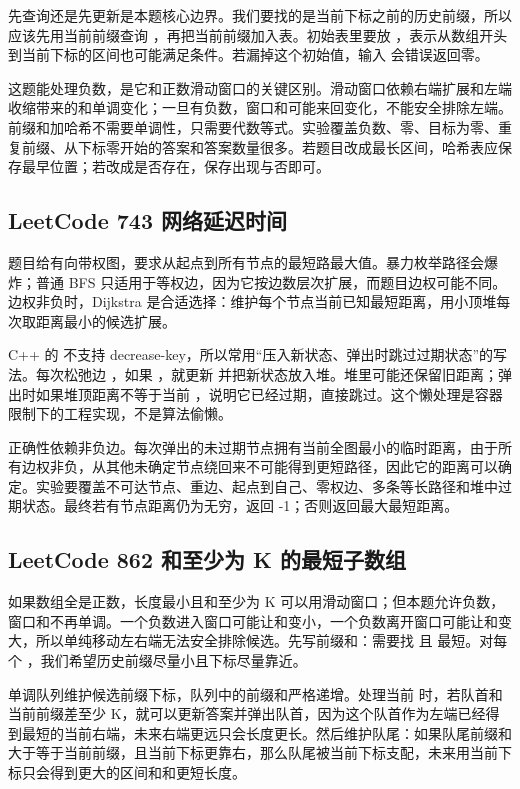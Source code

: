 先查询还是先更新是本题核心边界。我们要找的是当前下标之前的历史前缀，所以应该先用当前前缀查询 ，再把当前前缀加入表。初始表里要放 ，表示从数组开头到当前下标的区间也可能满足条件。若漏掉这个初始值，输入 \code{[k]} 会错误返回零。

这题能处理负数，是它和正数滑动窗口的关键区别。滑动窗口依赖右端扩展和左端收缩带来的和单调变化；一旦有负数，窗口和可能来回变化，不能安全排除左端。前缀和加哈希不需要单调性，只需要代数等式。实验覆盖负数、零、目标为零、重复前缀、从下标零开始的答案和答案数量很多。若题目改成最长区间，哈希表应保存最早位置；若改成是否存在，保存出现与否即可。

\subsection{LeetCode 743 网络延迟时间}

题目给有向带权图，要求从起点到所有节点的最短路最大值。暴力枚举路径会爆炸；普通 BFS 只适用于等权边，因为它按边数层次扩展，而题目边权可能不同。边权非负时，Dijkstra 是合适选择：维护每个节点当前已知最短距离，用小顶堆每次取距离最小的候选扩展。

C++ 的  不支持 decrease-key，所以常用“压入新状态、弹出时跳过过期状态”的写法。每次松弛边 ，如果 ，就更新  并把新状态放入堆。堆里可能还保留旧距离；弹出时如果堆顶距离不等于当前 ，说明它已经过期，直接跳过。这个懒处理是容器限制下的工程实现，不是算法偷懒。

正确性依赖非负边。每次弹出的未过期节点拥有当前全图最小的临时距离，由于所有边权非负，从其他未确定节点绕回来不可能得到更短路径，因此它的距离可以确定。实验要覆盖不可达节点、重边、起点到自己、零权边、多条等长路径和堆中过期状态。最终若有节点距离仍为无穷，返回 -1；否则返回最大最短距离。

\subsection{LeetCode 862 和至少为 K 的最短子数组}

如果数组全是正数，长度最小且和至少为 K 可以用滑动窗口；但本题允许负数，窗口和不再单调。一个负数进入窗口可能让和变小，一个负数离开窗口可能让和变大，所以单纯移动左右端无法安全排除候选。先写前缀和：需要找  且  最短。对每个 ，我们希望历史前缀尽量小且下标尽量靠近。

单调队列维护候选前缀下标，队列中的前缀和严格递增。处理当前  时，若队首和当前前缀差至少 K，就可以更新答案并弹出队首，因为这个队首作为左端已经得到最短的当前右端，未来右端更远只会长度更长。然后维护队尾：如果队尾前缀和大于等于当前前缀，且当前下标更靠右，那么队尾被当前下标支配，未来用当前下标只会得到更大的区间和和更短长度。

